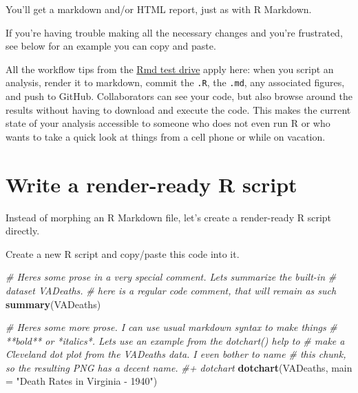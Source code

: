 \documentclass[
]{book}
\newenvironment{Shaded}{\begin{snugshade}}{\end{snugshade}}
\newcommand{\AttributeTok}[1]{\textcolor[rgb]{0.13,0.29,0.53}{#1}}
\newcommand{\CommentTok}[1]{\textcolor[rgb]{0.56,0.35,0.01}{\textit{#1}}}
\newcommand{\FunctionTok}[1]{\textcolor[rgb]{0.13,0.29,0.53}{\textbf{#1}}}
\newcommand{\NormalTok}[1]{#1}
\newcommand{\StringTok}[1]{\textcolor[rgb]{0.31,0.60,0.02}{#1}}
\begin{document}
You'll get a markdown and/or HTML report, just as with R Markdown.

If you're having trouble making all the necessary changes and you're frustrated, see below for an example you can copy and paste.

All the workflow tips from the \hyperref[rmd-test-drive]{Rmd test drive} apply here:
when you script an analysis, render it to markdown, commit the \texttt{.R}, the \texttt{.md}, any associated figures, and push to GitHub.
Collaborators can see your code, but also browse around the results without having to download and execute the code.
This makes the current state of your analysis accessible to someone who does not even run R or who wants to take a quick look at things from a cell phone or while on vacation.

\section{Write a render-ready R script}\label{write-a-render-ready-r-script}

Instead of morphing an R Markdown file, let's create a render-ready R script directly.

Create a new R script and copy/paste this code into it.

\begin{Shaded}
\begin{Highlighting}[]
\CommentTok{\#\textquotesingle{} Here\textquotesingle{}s some prose in a very special comment. Let\textquotesingle{}s summarize the built{-}in}
\CommentTok{\#\textquotesingle{} dataset \textasciigrave{}VADeaths\textasciigrave{}.}
\CommentTok{\# here is a regular code comment, that will remain as such}
\FunctionTok{summary}\NormalTok{(VADeaths)}

\CommentTok{\#\textquotesingle{} Here\textquotesingle{}s some more prose. I can use usual markdown syntax to make things}
\CommentTok{\#\textquotesingle{} **bold** or *italics*. Let\textquotesingle{}s use an example from the \textasciigrave{}dotchart()\textasciigrave{} help to}
\CommentTok{\#\textquotesingle{} make a Cleveland dot plot from the \textasciigrave{}VADeaths\textasciigrave{} data. I even bother to name}
\CommentTok{\#\textquotesingle{} this chunk, so the resulting PNG has a decent name.}
\CommentTok{\#+ dotchart}
\FunctionTok{dotchart}\NormalTok{(VADeaths, }\AttributeTok{main =} \StringTok{"Death Rates in Virginia {-} 1940"}\NormalTok{)}
\end{Highlighting}
\end{Shaded}
\end{document}
